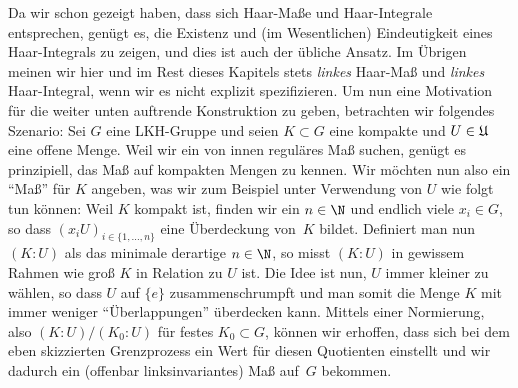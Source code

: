 \medskip
Da wir schon gezeigt haben, dass sich Haar-Maße und Haar-Integrale entsprechen,
genügt es, die Existenz und (im Wesentlichen) Eindeutigkeit eines Haar-Integrals
zu zeigen, und dies ist auch der übliche Ansatz. Im Übrigen meinen wir hier und
im Rest dieses Kapitels stets \emph{linkes} Haar-Maß und \emph{linkes}
Haar-Integral, wenn wir es nicht explizit spezifizieren. Um nun eine Motivation
für die weiter unten auftrende Konstruktion zu geben, betrachten wir folgendes
Szenario: Sei $G$ eine LKH-Gruppe und seien $K\subset G$ eine kompakte und
$U\in\mathfrak{U}$ eine offene Menge. Weil wir ein von innen reguläres Maß suchen,
genügt es prinzipiell, das Maß auf kompakten Mengen zu kennen. Wir möchten nun
also ein \enquote{Maß} für $K$ angeben, was wir zum Beispiel unter Verwendung
von $U$ wie folgt tun können:
Weil $K$ kompakt ist, finden wir ein $n\in\N$ und endlich viele $x_i\in G$, so
dass $(x_iU)_{i\in\{1,\ldots,n\}}$ eine Überdeckung von~$K$ bildet. Definiert
man nun $(K : U)$ als das minimale derartige $n\in\N$, so misst $(K : U)$ in
gewissem Rahmen wie groß $K$ in Relation zu $U$ ist. Die Idee ist nun, $U$ immer
kleiner zu wählen, so dass $U$ auf $\{e\}$ zusammenschrumpft und man somit die
Menge $K$ mit immer weniger \enquote{Überlappungen} überdecken kann. Mittels
einer Normierung, also $(K : U)/(K_0 : U)$ für festes $K_0\subset G$, können wir
erhoffen, dass sich bei dem eben skizzierten Grenzprozess ein Wert für diesen
Quotienten einstellt und wir dadurch ein (offenbar linksinvariantes) Maß auf~$G$
bekommen.



















